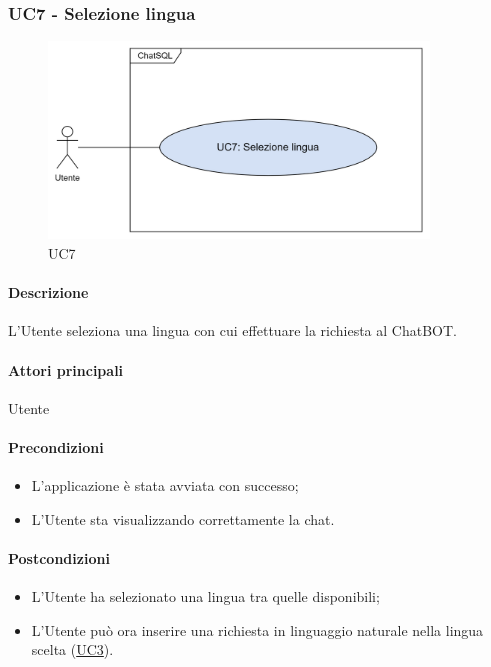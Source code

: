 \subsubsection{UC7 - Selezione lingua}\label{UC7}

\begin{figure}[H]
  \centering
  \includegraphics[width=0.90\textwidth]{assets/uc7.png}
  \caption{UC7}
\end{figure}

\paragraph*{Descrizione}
L'Utente seleziona una lingua con cui effettuare la richiesta al ChatBOT. 

\paragraph*{Attori principali}
Utente

\paragraph*{Precondizioni}
\begin{itemize}
  \item L'applicazione è stata avviata con successo;
  \item L'Utente sta visualizzando correttamente la chat.
\end{itemize}

\paragraph*{Postcondizioni}
\begin{itemize}
  \item L'Utente ha selezionato una lingua tra quelle disponibili;
  \item L'Utente può ora inserire una richiesta in linguaggio naturale nella lingua scelta (\hyperref[UC3]{UC3}).
\end{itemize}

